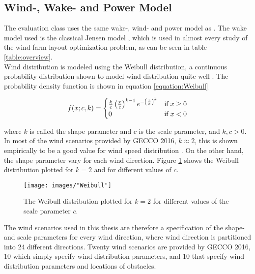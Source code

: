 \subsection{Wind-, Wake- and Power Model}\label{subsection:wind-, wake- and power model}
The evaluation class uses the same wake-, wind- and power model as \cite{Kusiak}. The wake model used is the classical Jensen model \citep{Jensen}, which is used in almost every study of the wind farm layout optimization problem, as can be seen in table \ref{table:overview}. \\

\noindent Wind distribution is modeled using the Weibull distribution, a continuous probability distribution shown to model wind distribution quite well \citep{Justus}. The probability density function is shown in equation \ref{equation:Weibull}


\begin{equation}
f(x; c, k)  = 
\begin{cases}
\frac{k}{c} \left( \frac{x}{c} \right)^{k-1} e^{- \left( \frac{x}{c} \right)^k } & \text{if} \hspace{1mm} x \geq 0 \\
0                                                                                                                      & \text{if} \hspace{1mm}     x < 0
\end{cases}
\label{equation:Weibull}
\end{equation}


\noindent where $k$ is called the shape parameter and $c$ is the scale parameter, and $k, c > 0$. In most of the wind scenarios provided by GECCO 2016, $k \approx 2$, this is shown empirically to be a good value for wind speed distribution \citep{Justus}. On the other hand, the shape parameter vary for each wind direction. Figure \ref{figure:weibull distribution} shows the Weibull distribution plotted for $k = 2$ and for different values of $c$. \\


\begin{figure}[h!]
\begin{center}
\texttt{[image: images/"Weibull"]}
\caption{The Weibull distribution plotted for $k = 2$ for different values of the scale parameter $c$.}
\label{figure:weibull distribution}
\end{center}
\end{figure}

\noindent The wind scenarios used in this thesis are therefore a specification of the shape- and scale parameters for every wind direction, where wind direction is partitioned into 24 different directions. Twenty wind scenarios are provided by GECCO 2016, 10 which simply specify wind distribution parameters, and 10 that specify wind distribution parameters and locations of obstacles. \\

